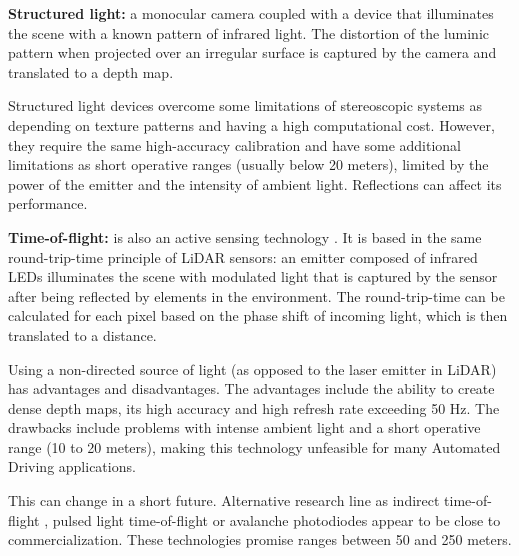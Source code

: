     
    
\textbf{Structured light:} a monocular camera coupled with a device that
illuminates the scene with a known pattern of infrared light. 
The distortion of the luminic pattern when projected over an irregular 
surface is captured by the camera and translated to a depth map.

Structured light devices overcome some limitations of stereoscopic systems
as depending on texture patterns and having a high computational cost. 
However, they require the same high-accuracy calibration \cite{Garbat2013}
and have some additional limitations as short operative ranges (usually 
below 20 meters), limited by the power of the emitter and the intensity of 
ambient light. Reflections can affect its performance.


\textbf{Time-of-flight:} is also an active sensing technology 
\cite{Hansard2013}. It is based in the same round-trip-time principle 
of LiDAR sensors: an emitter composed of infrared LEDs illuminates the scene
with modulated light that is captured by the sensor after being reflected by 
elements in the environment. 
The round-trip-time can be calculated for each pixel based on the phase shift 
of incoming light, which is then translated to a distance.

Using a non-directed source of light (as opposed to the laser emitter in 
LiDAR) has advantages and disadvantages. 
The advantages include the ability to create dense depth maps, its high 
accuracy and high refresh rate exceeding 50 Hz. The drawbacks include 
problems with intense ambient light and a short operative range (10 to 20 
meters), making this technology unfeasible for many Automated 
Driving applications.

This can change in a short future. Alternative research line as indirect
time-of-flight \cite{Villa2017}, pulsed light time-of-flight or avalanche
photodiodes \cite{Panasonic2018} appear to be close to commercialization. 
These technologies promise ranges between 50 and 250 meters.
    
